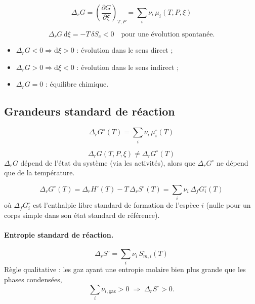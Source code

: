 \documentclass[11pt,a4paper]{article}
\newcommand{\dd}{\mathrm{d}}
\newcommand{\rG}{\Delta_r G}
\newcommand{\rH}{\Delta_r H}
\newcommand{\rS}{\Delta_r S}
\newcommand{\std}{^\circ}
\newcommand{\pd}[3]{\left(\frac{\partial #1}{\partial #2}\right)_{#3}}
\begin{document}
\begin{definition}[title={Enthalpie libre de réaction}]
\[
  \rG = \pd{G}{\xi}{T,P} = \sum_i \nu_i\,\mu_i(T,P,\xi)
\]
\end{definition}

\begin{resultat}[title={Critère d'évolution à $T$, $P$ fixés}]
\[
  \rG\,\dd\xi = -T\,\delta S_c < 0 \quad\text{pour une évolution spontanée.}
\]
\begin{itemize}[nosep]
  \item $\rG < 0 \Rightarrow \dd\xi > 0$ : évolution dans le sens direct ;
  \item $\rG > 0 \Rightarrow \dd\xi < 0$ : évolution dans le sens indirect ;
  \item $\rG = 0$ : équilibre chimique.
\end{itemize}
\end{resultat}

\subsection{Grandeurs standard de réaction}

\begin{definition}[title={Enthalpie libre standard de réaction}]
\[
  \rG\std(T) = \sum_i \nu_i\,\mu_i\std(T)
\]
\end{definition}

\begin{attention}
\[
  \rG(T,P,\xi) \neq \rG\std(T)
\]
$\rG$ dépend de l'état du système (via les activités), alors que $\rG\std$ ne
dépend que de la température.
\end{attention}

\begin{resultat}[title={Calcul de $\rG\std$}]
\[
  \rG\std(T) = \rH\std(T) - T\,\rS\std(T)
  = \sum_i \nu_i\,\Delta_f G_i\std(T)
\]
où $\Delta_f G_i\std$ est l'enthalpie libre standard de formation de l'espèce $i$
(nulle pour un corps simple dans son état standard de référence).
\end{resultat}

\paragraph{Entropie standard de réaction.}
\[
  \rS\std = \sum_i \nu_i\, S\std_{m,i}(T)
\]
Règle qualitative : les gaz ayant une entropie molaire bien plus grande que les
phases condensées,
\[
  \sum_i \nu_{i,\text{gaz}} > 0 \;\Longrightarrow\; \rS\std > 0 .
\]
\end{document}
